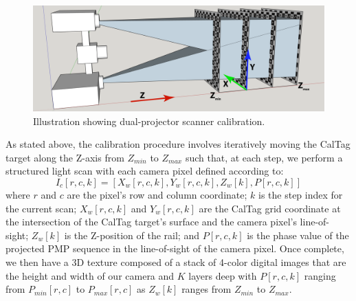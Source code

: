 \documentclass[]{spie}  %
\begin{document}
\begin{figure}
\centerline{\includegraphics[width=6.6in]{Figures/SLICalibrationDual}}
\vspace{0.1in}
\caption{Illustration showing dual-projector scanner calibration.}
\label{Fig:20}
\end{figure} 

As stated above, the calibration procedure involves iteratively moving the CalTag target along the Z-axis from $Z_{min}$ to $Z_{max}$ such that, at each step, we perform a structured light scan with each camera pixel defined according to:
\begin{equation}
I_c[r,c,k] = [X_w[r,c,k], Y_w[r,c,k], Z_w[k], P[r,c,k]]
\label{calEqn}
\end{equation}
where $r$ and $c$ are the pixel's row and column coordinate; $k$ is the step index for the current scan; $X_w[r,c,k]$ and $Y_w[r,c,k]$ are the CalTag grid coordinate at the intersection of the CalTag target's surface and the camera pixel's line-of-sight; $Z_w[k]$ is the Z-position of the rail; and $P[r,c,k]$ is the phase value of the projected PMP sequence in the line-of-sight of the camera pixel.  Once complete, we then have a 3D texture composed of a stack of 4-color digital images that are the height and width of our camera and $K$ layers deep with $P[r,c,k]$ ranging from $P_{min}[r,c]$ to $P_{max}[r,c]$ as $Z_w[k]$ ranges from $Z_{min}$ to $Z_{max}$.
\end{document}

